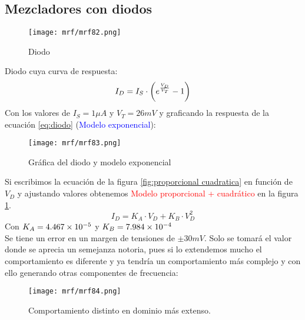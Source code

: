 \documentclass[
	12pt, %
	fleqn, %
	a4paper, %
	oneside, %
]{LegrandOrangeBook}
\begin{document}
\subsection{Mezcladores con diodos}
\begin{figure}[H]
\centering
\texttt{[image: mrf/mrf82.png]}
\caption{Diodo}
\end{figure}
Diodo cuya curva de respuesta:
\begin{equation}
I_D=I_S\cdot\left(e^{\frac{V_D}{V_T}}-1\right)
\label{eq:diodo}
\end{equation}
Con los valores de $I_S=1\mu A$ y $V_T=26 mV$ y graficando la respuesta de la ecuación \ref{eq:diodo} (\textcolor{blue}{Modelo exponencial}):
\begin{figure}[H]
\centering
\texttt{[image: mrf/mrf83.png]}
\caption{Gráfica del diodo y modelo exponencial}
\label{fig:grafica diodo}
\end{figure}
Si escribimos la ecuación de la figura \ref{fig:proporcional cuadratica} en función de $V_D$ y ajustando valores obtenemos \textcolor{red}{Modelo proporcional + cuadrático} en la figura \ref{fig:grafica diodo}.
\begin{equation}
I_D=K_A\cdot V_D+K_B\cdot V_D^2
\label{eq:diodo aprox}
\end{equation}
Con $K_A=4.467\times 10^{-5}$ y $K_B=7.984\times 10^{-4}$\\
Se tiene un error en un margen de tensiones de $\pm 30 mV$. Solo se tomará el valor donde se aprecia un semejanza notoria, pues si lo extendemos mucho el comportamiento es diferente y ya tendría un comportamiento más complejo y con ello generando otras componentes de frecuencia:
\begin{figure}[H]
\centering
\texttt{[image: mrf/mrf84.png]}
\caption{Comportamiento distinto en dominio más extenso.}
\end{figure}
\end{document}
